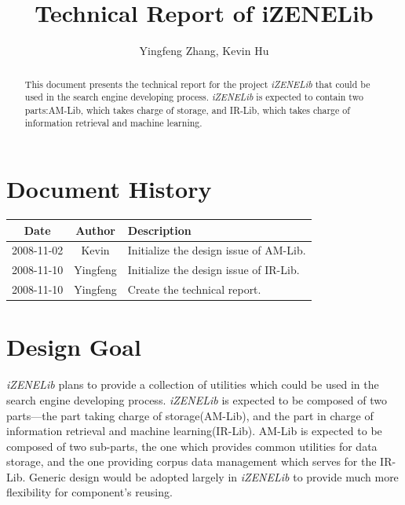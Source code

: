 \documentclass[a4paper,10pt]{article}
\begin{document}
\title{Technical Report of iZENELib}
\author{Yingfeng Zhang, Kevin Hu}
\maketitle
\begin{abstract}\centering
  This document presents the technical report for the project \emph{iZENELib} that could be used in the search engine developing process.
\emph{iZENELib} is expected to contain two parts:AM-Lib, which takes charge of storage, and IR-Lib, which takes charge of information 
retrieval and machine learning.
\end{abstract}

\tableofcontents

\section{Document History}
\begin{tabular}{|c|c|p{7cm}|}
    \hline
    Date & Author & Description \\ \hline
    2008-11-02& Kevin & Initialize the design issue of AM-Lib. \\ \hline
    2008-11-10& Yingfeng & Initialize the design issue of IR-Lib.  \\ \hline
    2008-11-10& Yingfeng & Create the technical report.  \\ \hline
\end{tabular}

\section{Design Goal}
 \emph{iZENELib} plans to provide a collection of utilities which could be used in the search engine developing process.
\emph{iZENELib} is expected to be composed of two parts---the part taking charge of storage(AM-Lib), and the part in charge
of information retrieval and machine learning(IR-Lib). AM-Lib is expected to be composed of two sub-parts, the one which provides 
common utilities for data storage, and the one providing corpus data management which serves for the IR-Lib. Generic design would 
be adopted largely in \emph{iZENELib} to provide much more flexibility for component's reusing.
\end{document}
